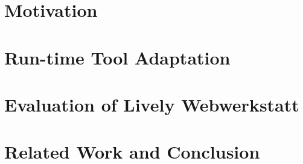 

%
%

\part{Motivation}


\part{Run-time Tool Adaptation} 

\part{Evaluation of Lively Webwerkstatt} 

\part{Related Work and Conclusion} 






